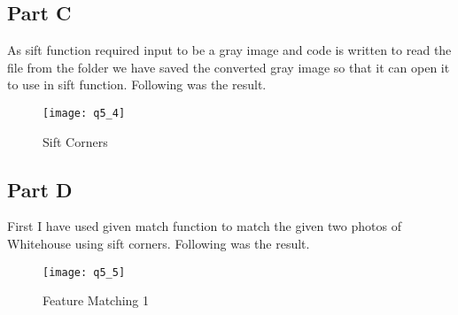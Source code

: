 	\subsection{Part C}
	As sift function required input to be a gray image and code is written to read the file from the folder we have saved the converted gray image so that it can open it to use in sift function. Following was the result.
	\newline	
	\begin{figure}[position = here]
		\begin{centering}
			\texttt{[image: q5\_4]}\\
			\caption[\textit{RPYAxes}]{Sift Corners}
		\end{centering}
	\end{figure}
	\newline
	\pagebreak
	
	\subsection{Part D}
	\newline
	First I have used given match function to match the given two photos of Whitehouse using sift corners. Following was the result.
	\newline	
	\begin{figure}[position = here]
		\begin{centering}
			\texttt{[image: q5\_5]}\\
			\caption[\textit{RPYAxes}]{Feature Matching 1}
		\end{centering}
	\end{figure}
	\newline
	
